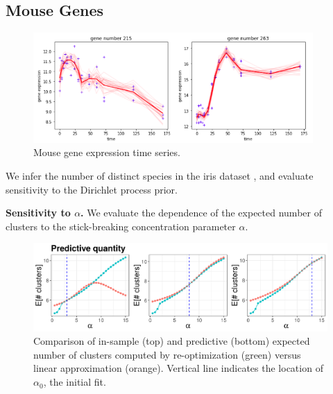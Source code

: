 \documentclass[a0,plainsections,30pt]{sciposter}\usepackage[]{graphicx}\usepackage[]{color}
\newenvironment{knitrout}{}{} %
\begin{document}
\begin{minipage}[t]{0.45\textwidth}
\begin{minipage}[t]{0.49\textwidth}
    \subsection*{Mouse Genes}
    \begin{figure}[!h]
    \centering
    \includegraphics[width = 0.95\textwidth]{./static_images/mouse_genes.png}
    \caption{Mouse gene expression time series.}
    \setlength{\textfloatsep}{-10pt}
    \end{figure}
\end{minipage}
We infer the number of distinct species in the iris
dataset \cite{iris_data_anderson}, and evaluate sensitivity to the Dirichlet process prior.
\vspace{0.1in}

{\bf \large Sensitivity to $\alpha$.}
We evaluate the dependence of the expected number of clusters to the stick-breaking concentration parameter $\alpha$.

\vspace{0.05in}
%


\begin{figure}
\centering
\begin{knitrout}
\color{fgcolor}

{\centering \includegraphics[width=0.98\linewidth,height=0.294\linewidth]{figure/param_sens_plot_thresh_0-1} 

}



\end{knitrout}
\caption{Comparison of in-sample (top) and predictive (bottom) expected number of clusters computed by re-optimization (green) versus linear approximation (orange).
Vertical line indicates the location of $\alpha_0$, the initial fit. }
\end{figure}


\end{minipage}
\end{document}

